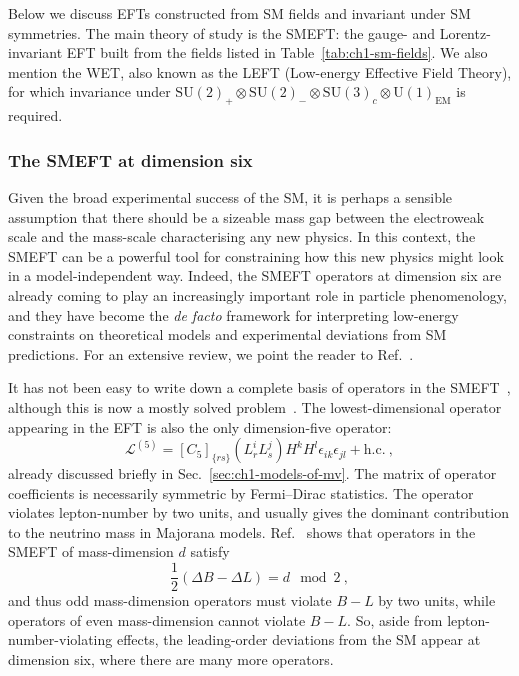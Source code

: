 Below we discuss EFTs constructed from SM fields and invariant under SM
symmetries. The main theory of study is the SMEFT: the gauge- and
Lorentz-invariant EFT built from the fields listed in Table~\ref{tab:ch1-sm-fields}.
We also mention the WET, also known as the LEFT (Low-energy Effective Field
Theory), for which invariance under
$\mathrm{SU}(2)_{+} \otimes \mathrm{SU}(2)_{-} \otimes \mathrm{SU}(3)_{c} \otimes \mathrm{U}(1)_{\text{EM}}$
is required.

\subsubsection{The SMEFT at dimension six}

Given the broad experimental success of the SM, it is perhaps a sensible
assumption that there should be a sizeable mass gap between the electroweak
scale and the mass-scale characterising any new physics. In this context, the
SMEFT can be a powerful tool for constraining how this new physics might look in
a model-independent way. Indeed, the SMEFT operators at dimension six are
already coming to play an increasingly important role in particle phenomenology,
and they have become the \textit{de facto} framework for interpreting low-energy
constraints on theoretical models and experimental deviations from SM
predictions. For an extensive review, we point the reader to
Ref.~\cite{Brivio:2017vri}.

It has not been easy to write down a complete basis of operators in the
SMEFT~\cite{Buchmuller:1985jz, Grzadkowski:2010es}, although this is now a
mostly solved problem~\cite{Lehman:2015via, Henning:2015daa, Lehman:2015coa,
  Henning:2015alf, Henning:2017fpj}. The lowest-dimensional operator appearing
in the EFT is also the only dimension-five operator:
\begin{equation}
  \mathscr{L}^{(5)} = [C_{5}]_{\{rs\}} (L^{i}_{r} L^{j}_{s}) H^{k} H^{l} \epsilon_{ik} \epsilon_{jl} + \text{h.c.} \ ,
\end{equation}
already discussed briefly in Sec.~\ref{sec:ch1-models-of-mv}. The matrix of operator
coefficients is necessarily symmetric by Fermi--Dirac statistics. The operator
violates lepton-number by two units, and usually gives the dominant contribution
to the neutrino mass in Majorana models. Ref.~\cite{Kobach:2016ami} shows that
operators in the SMEFT of mass-dimension $d$ satisfy
\begin{equation}
  \frac{1}{2} (\Delta B - \Delta L) = d \mod 2 \ ,
\end{equation}
and thus odd mass-dimension operators must violate $B - L$ by two units, while
operators of even mass-dimension cannot violate $B - L$. So, aside from
lepton-number-violating effects, the leading-order deviations from the SM appear
at dimension six, where there are many more operators.

